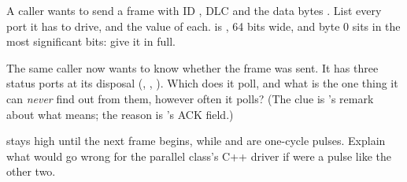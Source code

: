 \label{c11:ex:iface}
 A caller wants to send a frame with ID , DLC  and the data bytes
. List every port it has to drive, and the value of each.  is
, 64 bits wide, and byte 0 sits in the most significant bits: give it in full.

 The same caller now wants to know whether the frame was sent. It has three status ports at
its disposal (, , ). Which does it poll, and what is the one
thing it can \emph{never} find out from them, however often it polls? (The clue is
's remark about what  means; the reason is
's ACK field.)

  stays high until the next frame begins, while  and
 are one-cycle pulses. Explain what would go wrong for the parallel class's C++ driver
if  were a pulse like the other two.
